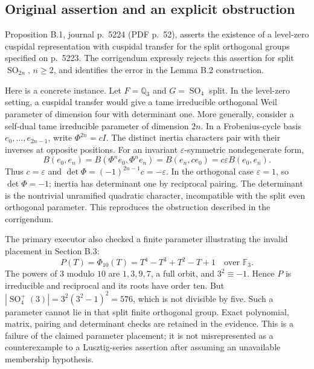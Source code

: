 \documentclass[10pt]{article}
\begin{document}
\subsection*{Original assertion and an explicit obstruction}
Proposition B.1, journal p. 5224 (PDF p. 52), asserts the existence of a level-zero cuspidal representation with cuspidal transfer for the split orthogonal groups specified on p. 5223. The corrigendum expressly rejects this assertion for split \(\operatorname{SO}_{2n}\), \(n\ge2\), and identifies the error in the Lemma B.2 construction.\par
Here is a concrete instance. Let \(F=\mathbb Q_3\) and \(G=\operatorname{SO}_4\) split. In the level-zero setting, a cuspidal transfer would give a tame irreducible orthogonal Weil parameter of dimension four with determinant one. More generally, consider a self-dual tame irreducible parameter of dimension \(2n\). In a Frobenius-cycle basis \(e_0,\ldots,e_{2n-1}\), write \(\Phi^{2n}=cI\). The distinct inertia characters pair with their inverses at opposite positions. For an invariant \(\varepsilon\)-symmetric nondegenerate form, \[B(e_0,e_n)
 =B(\Phi^ne_0,\Phi^ne_n)
 =B(e_n,ce_0)
 =c\varepsilon B(e_0,e_n).\] Thus \(c=\varepsilon\) and \(\det\Phi=(-1)^{2n-1}c=-\varepsilon\). In the orthogonal case \(\varepsilon=1\), so \(\det\Phi=-1\); inertia has determinant one by reciprocal pairing. The determinant is the nontrivial unramified quadratic character, incompatible with the split even orthogonal parameter. This reproduces the obstruction described in the corrigendum.\par
The primary executor also checked a finite parameter illustrating the invalid placement in Section B.3: \[P(T)=\Phi_{10}(T)=T^4-T^3+T^2-T+1
 \quad\text{over }\mathbb F_3.\] The powers of \(3\) modulo \(10\) are \(1,3,9,7\), a full orbit, and \(3^2\equiv-1\). Hence \(P\) is irreducible and reciprocal and its roots have order ten. But \(|\operatorname{SO}_4^+(3)|=3^2(3^2-1)^2=576\), which is not divisible by five. Such a parameter cannot lie in that split finite orthogonal group. Exact polynomial, matrix, pairing and determinant checks are retained in the evidence. This is a failure of the claimed parameter placement; it is not misrepresented as a counterexample to a Lusztig-series assertion after assuming an unavailable membership hypothesis.\par
\end{document}
